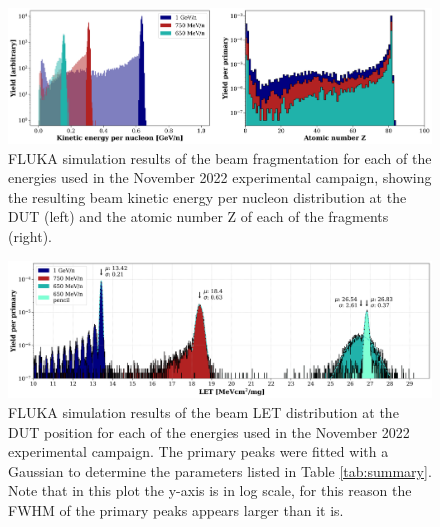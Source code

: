 \begin{figure}[t!]
    \centering
    \includegraphics[width=\textwidth]{images/fragmentation.png}
    \vspace*{-0.5cm}
    \caption{FLUKA simulation results of the beam fragmentation for each of the energies used in the November 2022 experimental campaign, showing the resulting beam kinetic energy per nucleon distribution at the DUT (left) and the atomic number Z of each of the fragments (right).}
    \label{fig:fragmentation}
\end{figure}

\begin{figure}[t!]
    \centering
    \includegraphics[width=\textwidth]{images/LETs.png}
    \vspace*{-0.5cm}
    \caption{FLUKA simulation results of the beam LET distribution at the DUT position for each of the energies used in the November 2022 experimental campaign. The primary peaks were fitted with a Gaussian to determine the parameters listed in Table \ref{tab:summary}. Note that in this plot the y-axis is in log scale, for this reason the FWHM of the primary peaks appears larger than it is.}
    \label{fig:LET}
\end{figure}